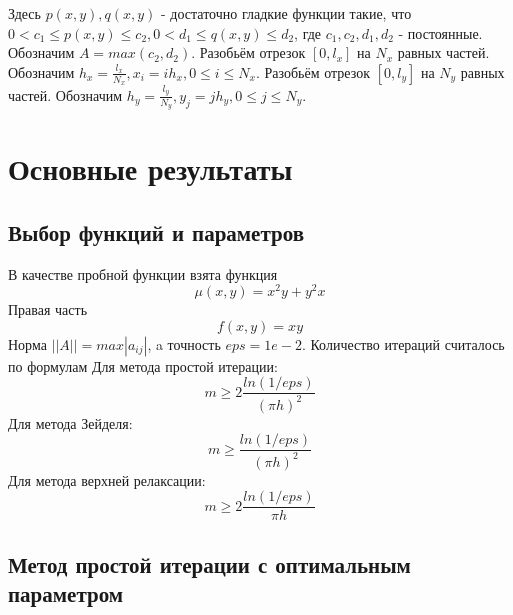 \documentclass[a4paper, 12pt]{article}
\begin{document}
	
	Здесь $p(x, y), q(x, y)$ - достаточно гладкие функции такие, что $0 < c_1 \le p(x, y) \le c_2, 0 < d_1 \le q(x, y) \le d_2$, где $c_1, c_2, d_1, d_2$ - постоянные.
	Обозначим $A = max(c_2, d_2)$.
	Разобьём отрезок $[0, l_x]$ на $N_x$ равных частей. Обозначим $h_x = \frac{l_x}{N_x}, x_i = i h_x, 0 \le i \le N_x.$
	\newline
	Разобьём отрезок $[0, l_y]$ на $N_y$ равных частей. Обозначим $h_y = \frac{l_y}{N_y}, y_j = j h_y, 0 \le j \le N_y.$
	\newline
	
	\newpage
	\section{Основные результаты}
	\subsection{Выбор функций и параметров}
	В качестве пробной функции взята функция
	$$\mu(x, y) = x^2 y + y^2 x$$ 
	Правая часть $$ f(x, y) = x y$$
	Норма $|| A || = max | a_{ij} |$, a точность $eps = 1e-2$.
	\newline
	Количество итераций считалось по формулам 
	\newline
	Для метода простой итерации:
	$$ m \ge 2 \frac{ln(1/eps)}{(\pi h)^2}$$	
	Для метода Зейделя:
	$$ m \ge \frac{ln(1/eps)}{(\pi h)^2}$$	
	Для метода верхней релаксации:
	$$ m \ge 2 \frac{ln(1/eps)}{\pi h}$$	
	
	\newpage
	\subsection{Метод простой итерации с оптимальным параметром}
		
\end{document}
